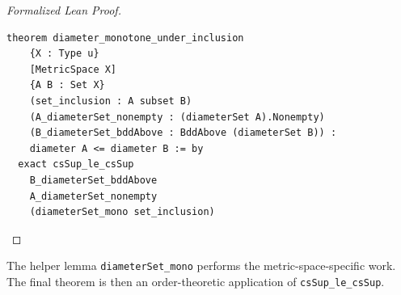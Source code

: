 \begin{proof}[Formalized Lean Proof]
\begin{verbatim}
theorem diameter_monotone_under_inclusion
    {X : Type u}
    [MetricSpace X]
    {A B : Set X}
    (set_inclusion : A subset B)
    (A_diameterSet_nonempty : (diameterSet A).Nonempty)
    (B_diameterSet_bddAbove : BddAbove (diameterSet B)) :
    diameter A <= diameter B := by
  exact csSup_le_csSup
    B_diameterSet_bddAbove
    A_diameterSet_nonempty
    (diameterSet_mono set_inclusion)
\end{verbatim}
\end{proof}

\begin{remark*}
The helper lemma \texttt{diameterSet\_mono} performs the metric-space-specific
work. The final theorem is then an order-theoretic application of
\texttt{csSup\_le\_csSup}.
\end{remark*}

\NoLocalDependencies

\clearpage

